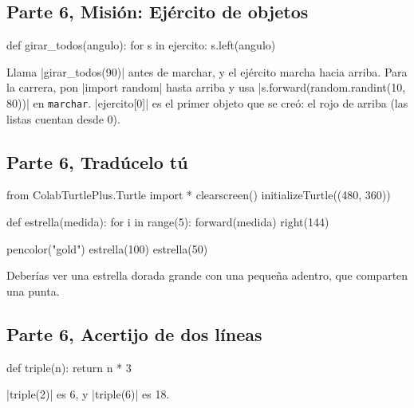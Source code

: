 \subsection*{Parte 6, Misión: Ejército de objetos}
\begin{codenonum}
def girar_todos(angulo):
    for s in ejercito:
        s.left(angulo)
\end{codenonum}
Llama \py|girar_todos(90)| antes de marchar, y el ejército marcha hacia arriba. Para la carrera, pon \py|import random| hasta arriba y usa \py|s.forward(random.randint(10, 80))| en \texttt{marchar}. \py|ejercito[0]| es el primer objeto que se creó: el rojo de arriba (las listas cuentan desde 0).

\subsection*{Parte 6, Tradúcelo tú}
\begin{codenonum}
from ColabTurtlePlus.Turtle import *
clearscreen()
initializeTurtle((480, 360))

def estrella(medida):
    for i in range(5):
        forward(medida)
        right(144)

pencolor("gold")
estrella(100)
estrella(50)
\end{codenonum}
Deberías ver una estrella dorada grande con una pequeña adentro, que comparten una punta.

\subsection*{Parte 6, Acertijo de dos líneas}
\begin{codenonum}
def triple(n):
    return n * 3
\end{codenonum}
\py|triple(2)| es 6, y \py|triple(6)| es 18.
